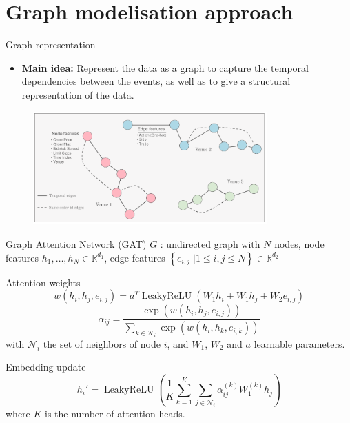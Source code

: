 \documentclass{beamer}
\newcommand{\R}{\mathbb{R}}
\DeclareMathOperator{\leakyrelu}{LeakyReLU}
\begin{document}
\section{Graph modelisation approach}
\begin{frame}{Graph representation}
    \begin{itemize}
        \item \textbf{Main idea:} Represent the data as a graph to capture the temporal dependencies between the events, as well as to give a structural representation of the data.
    \end{itemize}
    \begin{figure}[H]
        \centering
        \includegraphics[width=0.8\textwidth]{figures/graph_structure.png}
    \end{figure}
\end{frame}

\begin{frame}{Graph Attention Network (GAT)}
    $G$ : undirected graph with $N$ nodes, node features $h_1, \ldots, h_N \in \mathbb{R}^{d_1}$, edge features $\left\{e_{i,j} \; | 1\leq i,j\leq N\right\} \in\R^{d_2}$
    \begin{block}{Attention weights}
        \begin{equation*}
            w(h_i,h_j, e_{i,j}) = a^T \leakyrelu(W_1h_i + W_1h_j + W_2e_{i,j})
        \end{equation*}
        \begin{equation*}
            \alpha_{ij} = \frac{\exp(w(h_i,h_j, e_{i,j}))}{\sum_{k\in\mathcal{N}_i}\exp(w(h_i,h_k, e_{i,k}))}
        \end{equation*}
        with $\mathcal{N}_i$ the set of neighbors of node $i$, and $W_1$, $W_2$ and $a$ learnable parameters.
    \end{block}
    \begin{block}{Embedding update}
        \begin{equation*}
            h_i' = \leakyrelu\left(\frac{1}{K}\sum_{k=1}^K\sum_{j\in\mathcal{N}_i}\alpha_{ij}^{(k)}W_1^{(k)}h_j\right)
        \end{equation*}
        where $K$ is the number of attention heads.
    \end{block}
\end{frame}
\end{document}
